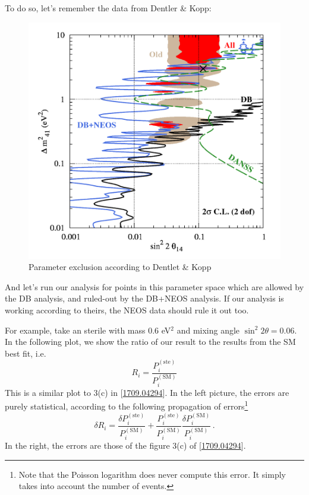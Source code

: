 \documentclass[a4paper, 10 pt]{article}
\begin{document}
To do so, let's remember the data from Dentler \& Kopp:
\begin{figure}[h]
	\centering
	\includegraphics[width=0.6\linewidth]{DentlerKoppParameterSpace}
	\caption{Parameter exclusion according to Dentlet \& Kopp}
	\label{fig:dentlerkoppparameterspace}
\end{figure}


And let's run our analysis for points in this parameter space which are allowed by the DB analysis, and ruled-out by the DB+NEOS analysis. If our analysis is working according to theirs, the NEOS data should rule it out too.

For example, take an sterile with mass 0.6 eV$^2$ and mixing angle $\sin^2 2\theta= 0.06$. In the following plot, we show the ratio of our result to the results from the SM best fit, i.e.
\begin{equation}
R_i = \frac{P_i^{(\text{ste})}}{P_i^{(\text{SM})}}
\end{equation}
 This is a similar plot to 3(c) in [\href{https://arxiv.org/pdf/1709.04294v2.pdf}{1709.04294}]. In the left picture, the errors are purely statistical, according to the following propagation of errors\footnote{Note that the Poisson logarithm does never compute this error. It simply takes into account the number of events.}
 \begin{equation}
 \delta R_i = \frac{\delta P_i^{(\text{ste})}}{P_i^{(\text{SM})}} + \frac{P_i^{(\text{ste})}}{P_i^{(\text{SM})}}\frac{\delta P_i^{(\text{SM})}}{P_i^{(\text{SM})}}\, .
 \end{equation}In the right, the errors are those of the figure 3(c) of  [\href{https://arxiv.org/pdf/1709.04294v2.pdf}{1709.04294}].
\end{document}
